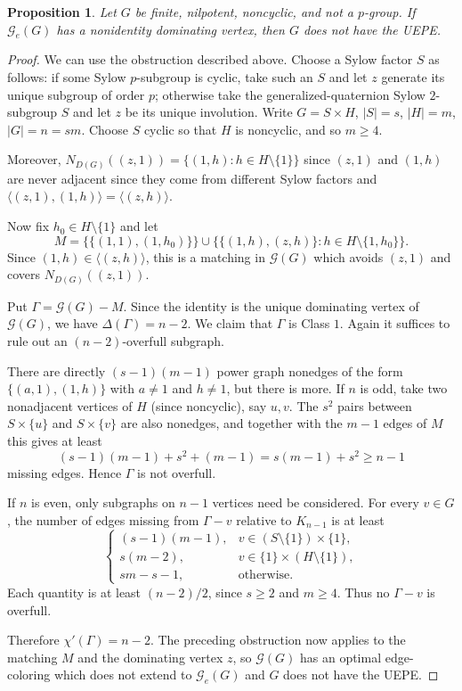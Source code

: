 \documentclass{article}
\newtheorem{proposition}[theorem]{Proposition}
\theoremstyle{definition}
\theoremstyle{indentclaim}
\theoremstyle{named}
\theoremstyle{named}
\begin{document}
\begin{proposition}\label{thm:nilpotent-dominating-obstruction}
Let $G$ be finite, nilpotent, noncyclic, and not a $p$-group.  If $\mathscr G_e(G)$ has a nonidentity dominating vertex, then $G$ does not have the UEPE.
\end{proposition}


\begin{proof}
We can use the obstruction described above. Choose a Sylow factor $S$ as follows:
if some Sylow $p$-subgroup is cyclic, take such an $S$ and let $z$ generate
its unique subgroup of order $p$; otherwise take the generalized-quaternion
Sylow $2$-subgroup $S$ and let $z$ be its unique involution. Write $G=S\times H$, $|S|=s$, $|H|=m$, $|G|=n=sm$.
Choose $S$ cyclic so that $H$ is noncyclic, and so
$m\geq 4$. 

Moreover, $N_{D(G)}((z,1))=\{(1,h):h\in H\setminus\{1\}\}$ since $(z, 1)$ and $(1, h)$ are never adjacent since they come from different Sylow factors and $\langle (z,1),(1,h)\rangle = \langle(z,h)\rangle$. 

Now fix $h_0\in H\setminus\{1\}$ and let
\[
M=
\bigl\{\{(1,1),(1,h_0)\}\bigr\}
\cup
\bigl\{\{(1,h),(z,h)\}:h\in H\setminus\{1,h_0\}\bigr\}.
\]
Since $(1,h)\in\langle(z,h)\rangle$, this is a matching in
$\mathscr G(G)$ which avoids $(z,1)$ and covers $N_{D(G)}((z,1))$.

Put $\Gamma=\mathscr G(G)-M$. Since the identity is the unique dominating
vertex of $\mathscr G(G)$, we have $\Delta(\Gamma)=n-2$. We claim that
$\Gamma$ is Class $1$. Again it suffices to rule out an
$(n-2)$-overfull subgraph.

There are directly $(s-1)(m-1)$ power graph nonedges of the form
$\{(a,1),(1,h)\}$ with $a\neq1$ and $h\neq1$, but there is more. If $n$ is odd, take two nonadjacent vertices of $H$ (since noncyclic), say $u,v$. The $s^2$ pairs between $S\times\{u\}$ and
$S\times\{v\}$ are also nonedges, and together with the $m-1$ edges of
$M$ this gives at least
\[
(s-1)(m-1)+s^2+(m-1)
=s(m-1)+s^2\geq n-1
\]
missing edges. Hence $\Gamma$ is not overfull.

If $n$ is even, only subgraphs on $n-1$ vertices need be considered.
For every $v\in G$, the number of edges missing from $\Gamma-v$ relative
to $K_{n-1}$ is at least
\[
\begin{cases}
(s-1)(m-1), & v\in(S\setminus\{1\})\times\{1\},\\
s(m-2), & v\in\{1\}\times(H\setminus\{1\}),\\
sm-s-1, & \text{otherwise}.
\end{cases}
\]
Each quantity is at least $(n-2)/2$, since $s\geq2$ and $m\geq4$.
Thus no $\Gamma-v$ is overfull.

Therefore $\chi'(\Gamma)=n-2$. The preceding obstruction now applies to
the matching $M$ and the dominating vertex $z$, so $\mathscr G(G)$ has
an optimal edge-coloring which does not extend to $\mathscr G_e(G)$ and $G$ does not have the UEPE. 
\end{proof}
\end{document}
